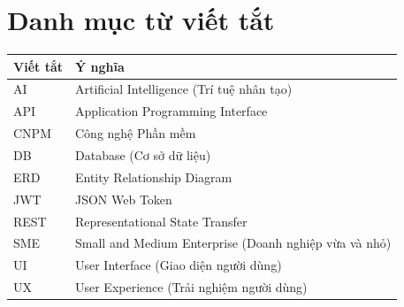 \documentclass[14pt, a4paper]{extreport}
\begin{document}
\chapter*{Danh mục từ viết tắt}
\begin{table}[H]
\centering
\begin{tabular}{p{3cm} p{10cm}}
\toprule
\textbf{Viết tắt} & \textbf{Ý nghĩa} \\
\midrule
AI     & Artificial Intelligence (Trí tuệ nhân tạo) \\
API    & Application Programming Interface \\
CNPM   & Công nghệ Phần mềm \\
DB     & Database (Cơ sở dữ liệu) \\
ERD    & Entity Relationship Diagram \\
JWT    & JSON Web Token \\
REST   & Representational State Transfer \\
SME    & Small and Medium Enterprise (Doanh nghiệp vừa và nhỏ) \\
UI     & User Interface (Giao diện người dùng) \\
UX     & User Experience (Trải nghiệm người dùng) \\
\bottomrule
\end{tabular}
\end{table}
\newpage

\setcounter{page}{1}








\printbibliography[heading=bibintoc, title={Tài liệu tham khảo}]

\appendix

\end{document}
